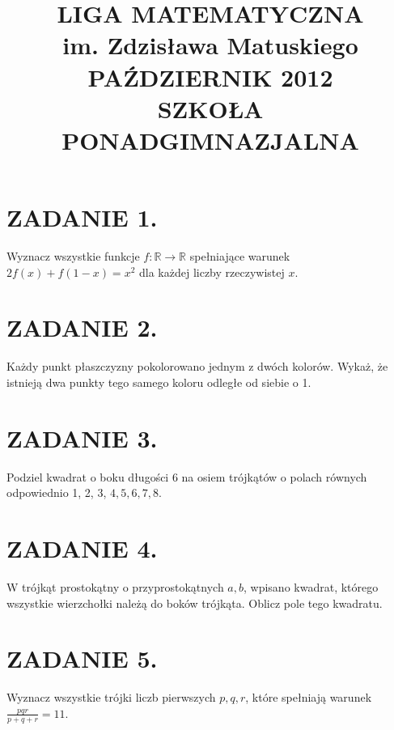 \documentclass[10pt]{article}
\title{LIGA MATEMATYCZNA \\
 im. Zdzisława Matuskiego \\
 PAŹDZIERNIK 2012 \\
 SZKOŁA PONADGIMNAZJALNA }
\author{}
\date{}
\begin{document}
\maketitle
\section*{ZADANIE 1.}
Wyznacz wszystkie funkcje \(f: \mathbb{R} \rightarrow \mathbb{R}\) spełniające warunek \(2 f(x)+f(1-x)=x^{2}\) dla każdej liczby rzeczywistej \(x\).

\section*{ZADANIE 2.}
Każdy punkt płaszczyzny pokolorowano jednym z dwóch kolorów. Wykaż, że istnieją dwa punkty tego samego koloru odległe od siebie o 1.

\section*{ZADANIE 3.}
Podziel kwadrat o boku długości 6 na osiem trójkątów o polach równych odpowiednio 1, 2, 3, \(4,5,6,7,8\).

\section*{ZADANIE 4.}
W trójkąt prostokątny o przyprostokątnych \(a, b\), wpisano kwadrat, którego wszystkie wierzchołki należą do boków trójkąta. Oblicz pole tego kwadratu.

\section*{ZADANIE 5.}
Wyznacz wszystkie trójki liczb pierwszych \(p, q, r\), które spełniają warunek \(\frac{p q r}{p+q+r}=11\).
\end{document}
